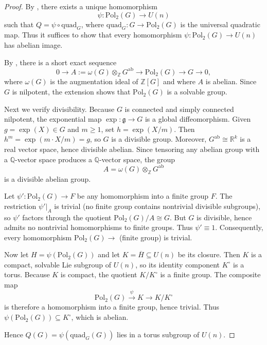 \documentclass[12pt,reqno,a4paper,dvipsnames]{amsart}
\theoremstyle{plain}
\theoremstyle{definition}
\numberwithin{theorem}{section}
\numberwithin{equation}{section}
\begin{document}
\begin{proof}
By \cite[Theorem~1.2]{quadratic}, there exists a unique homomorphism 
\[
    \psi\colon \mathrm{Pol}_2(G)\to U(n)
\]
such that $Q=\psi\circ \mathrm{quad}_G$, where 
$\mathrm{quad}_G\colon G\to \mathrm{Pol}_2(G)$ is the universal quadratic map.  
Thus it suffices to show that every homomorphism 
$\psi\colon \mathrm{Pol}_2(G)\to U(n)$ has abelian image.

By \cite[Theorem~1.3]{quadratic}, there is a short exact sequence
\[
0 \longrightarrow A:=\omega(G)\otimes_{\mathbb{Z}} G^{\mathrm{ab}}
   \longrightarrow \mathrm{Pol}_2(G)
   \longrightarrow G 
   \longrightarrow 0,
\]
where $\omega(G)$ is the augmentation ideal of $\mathbb{Z}[G]$ and where 
$A$ is abelian.  
Since $G$ is nilpotent, the extension shows that $\mathrm{Pol}_2(G)$ is a solvable group.

Next we verify divisibility.  
Because $G$ is connected and simply connected nilpotent, the exponential map 
$\exp\colon\mathfrak g\to G$ is a global diffeomorphism.  
Given $g=\exp(X)\in G$ and $m\ge1$, set $h=\exp(X/m)$.  
Then $h^m=\exp(m\cdot X/m)=g$, so $G$ is a divisible group.  
Moreover, $G^{\mathrm{ab}}\cong \mathbb{R}^k$ is a real vector space, hence divisible abelian.  
Since tensoring any abelian group with a $\mathbb{Q}$-vector space produces a
$\mathbb{Q}$-vector space, the group
\[
A=\omega(G)\otimes_{\mathbb{Z}} G^{\mathrm{ab}}
\]
is a divisible abelian group.

Let $\psi'\colon \mathrm{Pol}_2(G)\to F$ be any homomorphism into a finite group $F$.  
The restriction $\psi'|_A$ is trivial (no finite group contains nontrivial divisible subgroups),
so $\psi'$ factors through the quotient $\mathrm{Pol}_2(G)/A\cong G$.
But $G$ is divisible, hence admits no nontrivial homomorphisms to finite groups.
Thus $\psi'\equiv 1$.  
Consequently, every homomorphism $\mathrm{Pol}_2(G)\to$ (finite group) is trivial.

Now let $H=\psi(\mathrm{Pol}_2(G))$ and let $K=\overline{H}\subseteq U(n)$ be its closure.
Then $K$ is a compact, solvable Lie subgroup of $U(n)$, so its identity component
$K^\circ$ is a torus.  
Because $K$ is compact, the quotient $K/K^\circ$ is a finite group.  
The composite map
\[
\mathrm{Pol}_2(G)\xrightarrow{\psi} K \longrightarrow K/K^\circ
\]
is therefore a homomorphism into a finite group, hence trivial.
Thus $\psi(\mathrm{Pol}_2(G))\subseteq K^\circ$, which is abelian.

Hence $Q(G)=\psi(\mathrm{quad}_G(G))$ lies in a torus subgroup of $U(n)$.
\end{proof}
\end{document}
